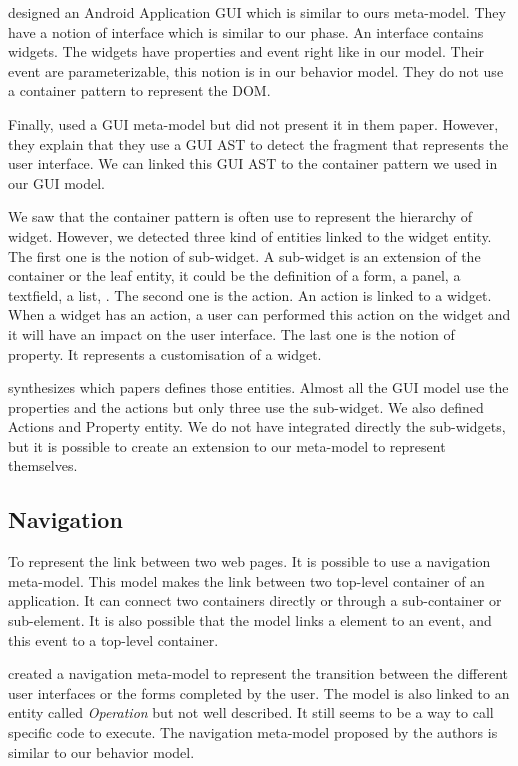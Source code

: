 \documentclass[conference]{IEEEtran}
\begin{document}
\citet{amalfitano2012using} designed an Android Application GUI which is similar to ours meta-model.
They have a notion of interface which is similar to our phase.
An interface contains widgets.
The widgets have properties and event right like in our model.
Their event are parameterizable, this notion is in our behavior model.
They do not use a container pattern to represent the DOM.

Finally, \citet{silva2010guisurfer} used a GUI meta-model but did not present it
    in them paper.
However, they explain that they use a GUI AST to detect the fragment that represents the user interface.
We can linked this GUI AST to the container pattern we used in our GUI model.


We saw that the container pattern is often use to represent the hierarchy of widget.
However, we detected three kind of entities linked to the widget entity. 
The first one is the notion of sub-widget.
A sub-widget is an extension of the container or the leaf entity,
    it could be the definition of a form, a panel, a textfield, a list, \etc.
The second one is the action.
An action is linked to a widget.
When a widget has an action, a user can performed this action on the widget and it will
    have an impact on the user interface.
The last one is the notion of property.
It represents a customisation of a widget.

 synthesizes which papers defines those entities.
Almost all the GUI model use the properties and the actions but
    only three use the sub-widget.
We also defined Actions and Property entity.
We do not have integrated directly the sub-widgets, but it is possible to create an extension to our meta-model
    to represent themselves.

\subsection{Navigation}
\label{sec:navigation}

To represent the link between two web pages.
It is possible to use a navigation meta-model.
This model makes the link between two top-level container of
    an application.
It can connect two containers directly or through a sub-container or sub-element.
It is also possible that the model links a element to an event,
    and this event to a top-level container.

\citet{fleurey2007model} created a navigation meta-model to represent the
    transition between the different user interfaces or the forms completed by the user.
The model is also linked to an entity called \textit{Operation} but not well described.
It still seems to be a way to call specific code to execute.
The navigation meta-model proposed by the authors is similar to our behavior model.
\end{document}
